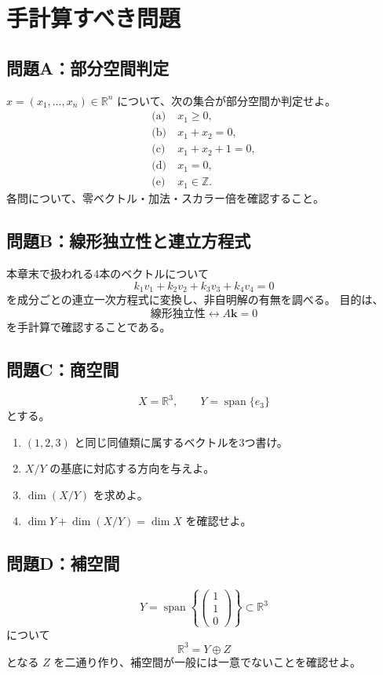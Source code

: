\documentclass[a4paper,11pt]{ltjsarticle}
\newcommand{\R}{\mathbb{R}}
\newcommand{\Span}{\operatorname{span}}
\begin{document}
\section{手計算すべき問題}

\subsection*{問題A：部分空間判定}
$x=(x_1,\dots,x_n)\in\R^n$ について、次の集合が部分空間か判定せよ。
\begin{align*}
\text{(a)}\ &x_1\ge 0,\\
\text{(b)}\ &x_1+x_2=0,\\
\text{(c)}\ &x_1+x_2+1=0,\\
\text{(d)}\ &x_1=0,\\
\text{(e)}\ &x_1\in\mathbb{Z}.
\end{align*}
各問について、零ベクトル・加法・スカラー倍を確認すること。

\subsection*{問題B：線形独立性と連立方程式}
本章末で扱われる4本のベクトルについて
\[
k_1v_1+k_2v_2+k_3v_3+k_4v_4=0
\]
を成分ごとの連立一次方程式に変換し、非自明解の有無を調べる。
目的は、
\[
\text{線形独立性}\longleftrightarrow A\bm{k}=0
\]
を手計算で確認することである。

\subsection*{問題C：商空間}
\[
X=\R^3,\qquad Y=\Span\{e_3\}
\]
とする。
\begin{enumerate}
  \item $(1,2,3)$ と同じ同値類に属するベクトルを3つ書け。
  \item $X/Y$ の基底に対応する方向を与えよ。
  \item $\dim(X/Y)$ を求めよ。
  \item $\dim Y+\dim(X/Y)=\dim X$ を確認せよ。
\end{enumerate}

\subsection*{問題D：補空間}
\[
Y=\Span\left\{\begin{pmatrix}1\\1\\0\end{pmatrix}\right\}
\subset\R^3
\]
について
\[
\R^3=Y\oplus Z
\]
となる $Z$ を二通り作り、補空間が一般には一意でないことを確認せよ。
\end{document}
